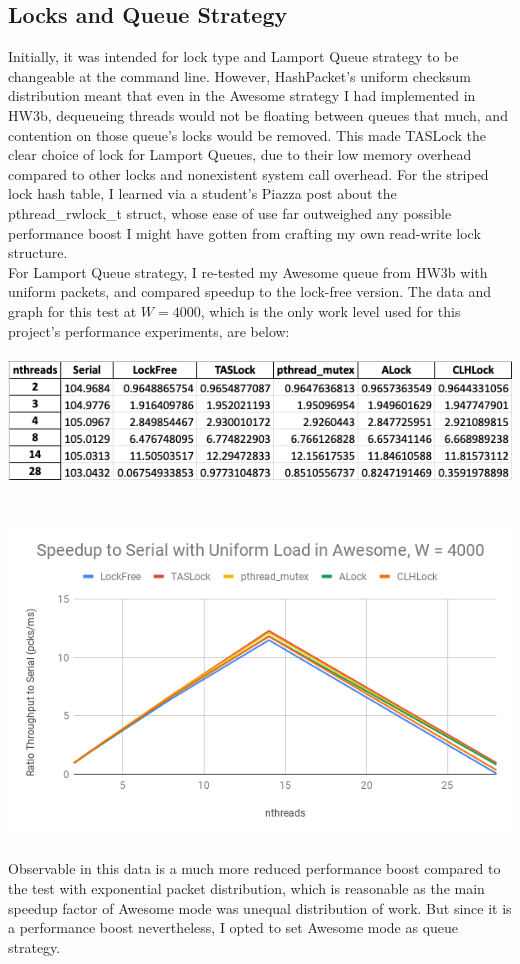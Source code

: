 \documentclass{article}
\begin{document}
\begin{adjustwidth}{-2cm}{-2cm}
\subsection{Locks and Queue Strategy}
Initially, it was intended for lock type and Lamport Queue strategy to be changeable at the command line. However, HashPacket's uniform checksum distribution meant that even in the Awesome strategy I had implemented in HW3b, dequeueing threads would not be floating between queues that much, and contention on those queue's locks would be removed. This made TASLock the clear choice of lock for Lamport Queues, due to their low memory overhead compared to other locks and nonexistent system call overhead. For the striped lock hash table, I learned via a student's Piazza post about the pthread\_rwlock\_t struct, whose ease of use far outweighed any possible performance boost I might have gotten from crafting my own read-write lock structure.\\
For Lamport Queue strategy, I re-tested my Awesome queue from HW3b with uniform packets, and compared speedup to the lock-free version. The data and graph for this test at $W=4000$, which is the only work level used for this project's performance experiments, are below:\\
\null\\
\includegraphics[width=\linewidth]{awesomeq_vs_lockfree_data.png}\\ \null\\
\null\\
\includegraphics[width=\linewidth]{awesomeq_vs_lockfree_graph.png}\\ \null\\
Observable in this data is a much more reduced performance boost compared to the test with exponential packet distribution, which is reasonable as the main speedup factor of Awesome mode was unequal distribution of work. But since it is a performance boost nevertheless, I opted to set Awesome mode as queue strategy.

\end{adjustwidth}
\end{document}
